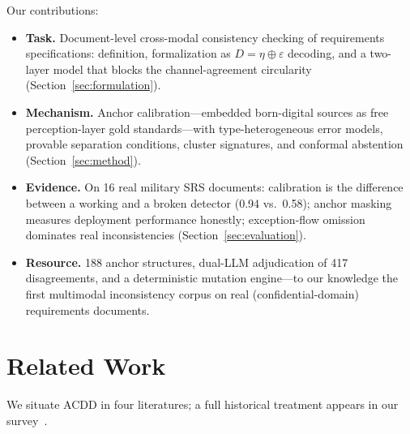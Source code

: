 \documentclass[10pt,twocolumn]{article}
\begin{document}
Our contributions:
\begin{itemize}
\item \textbf{Task.}  Document-level cross-modal consistency checking
of requirements specifications: definition, formalization as
$D = \eta \oplus \varepsilon$ decoding, and a two-layer model that
blocks the channel-agreement circularity
(Section~\ref{sec:formulation}).
\item \textbf{Mechanism.}  Anchor calibration---embedded born-digital
sources as free perception-layer gold standards---with
type-heterogeneous error models, provable separation conditions,
cluster signatures, and conformal abstention
(Section~\ref{sec:method}).
\item \textbf{Evidence.}  On 16 real military SRS documents:
calibration is the difference between a working and a broken detector
(0.94 vs.\ 0.58); anchor masking measures deployment performance
honestly; exception-flow omission dominates real inconsistencies
(Section~\ref{sec:evaluation}).
\item \textbf{Resource.}  188 anchor structures, dual-LLM adjudication
of 417 disagreements, and a deterministic mutation engine---to our
knowledge the first multimodal inconsistency corpus on real
(confidential-domain) requirements documents.
\end{itemize}

\section{Related Work}
\label{sec:related}

We situate ACDD in four literatures; a full historical treatment
appears in our survey~\cite{oursurvey2026}.
\end{document}
